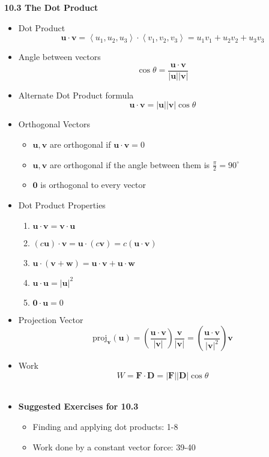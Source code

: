\documentclass[12pt]{article}
\newcommand{\vect}[1]{\mathbf{#1}}
\newcommand{\proj}{\textrm{proj}}
\newcommand{\<}{\left<}
\renewcommand{\>}{\right>}
\begin{document}
\newpage
	
\centerline{\bf 10.3 The Dot Product}
	
		\begin{itemize}
		\item Dot Product
			\[ \vect{u} \cdot \vect{v} = \<u_1,u_2,u_3\>\cdot\<v_1,v_2,v_3\> = u_1v_1 + u_2v_2 + u_3v_3 \]
	
		\item Angle between vectors
			\[\cos\theta = \frac{\vect{u}\cdot\vect{v}}{|\vect{u}||\vect{v}|}\] 
			
		\item Alternate Dot Product formula
			\[\vect{u} \cdot \vect{v} = |\vect{u}||\vect{v}|\cos \theta \]
			
		\item Orthogonal Vectors
			\begin{itemize}
			\item	$\vect{u},\vect{v}$ are orthogonal if $\vect{u} \cdot \vect{v} = 0$
			\item $\vect{u},\vect{v}$ are orthogonal if the angle between them is $\frac{\pi}{2} = 90^\circ$
			\item $\vect{0}$ is orthogonal to every vector
			\end{itemize}
		
		\item Dot Product Properties
			\begin{enumerate}
			\item $\vect{u} \cdot \vect{v} = \vect{v}\cdot\vect{u}$
			\item $(c\vect{u})\cdot \vect{v} = \vect{u} \cdot (c\vect{v}) = c(\vect{u} \cdot \vect{v})$
			\item $\vect{u} \cdot (\vect{v} + \vect{w}) = \vect{u}\cdot\vect{v} + \vect{u}\cdot \vect{w}$
			\item $\vect{u} \cdot \vect{u} = |\vect{u}|^2$
			\item $\vect{0} \cdot \vect{u} = 0$
			\end{enumerate}
		
		\item Projection Vector
			\[\proj_{\vect{v}}(\vect{u}) = \left(\frac{\vect{u}\cdot\vect{v}}{|\vect{v}|} \right)\frac{\vect{v}}{|\vect{v}|} = \left(\frac{\vect{u}\cdot\vect{v}}{|\vect{v}|^2} \right)\vect{v}\]

		\item Work
			\[W = \vect{F} \cdot \vect{D} = |\vect{F}||\vect{D}|\cos \theta\]\
		
		\item \textbf{Suggested Exercises for 10.3}
			\begin{itemize}
			\item Finding and applying dot products: 1-8
			\item Work done by a constant vector force: 39-40
			\end{itemize}
		\end{itemize}
	
\end{document}
